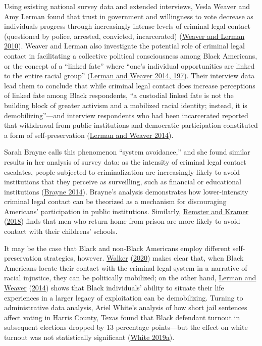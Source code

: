 \documentclass[
  12pt,
]{article}
\begin{document}
Using existing national survey data and extended interviews, Vesla Weaver and Amy Lerman found that trust in government and willingness to vote decrease as individuals progress through increasingly intense levels of criminal legal contact (questioned by police, arrested, convicted, incarcerated) (\protect\hyperlink{ref-Weaver2010}{Weaver and Lerman 2010}). Weaver and Lerman also investigate the potential role of criminal legal contact in facilitating a collective political consciousness among Black Americans, or the concept of a ``linked fate'' where ``one's individual opportunities are linked to the entire racial group'' (\protect\hyperlink{ref-Lerman2014}{Lerman and Weaver 2014, 197}). Their interview data lead them to conclude that while criminal legal contact does increase perceptions of linked fate among Black respondents, ``a custodial linked fate is not the building block of greater activism and a mobilized racial identity; instead, it is demobilizing''---and interview respondents who had been incarcerated reported that withdrawal from public institutions and democratic participation constituted a form of self-preservation (\protect\hyperlink{ref-Lerman2014}{Lerman and Weaver 2014}).

Sarah Brayne calls this phenomenon ``system avoidance,'' and she found similar results in her analysis of survey data: as the intensity of criminal legal contact escalates, people subjected to criminalization are increasingly likely to avoid institutions that they perceive as surveilling, such as financial or educational institutions (\protect\hyperlink{ref-Brayne2014}{Brayne 2014}). Brayne's analysis demonstrates how lower-intensity criminal legal contact can be theorized as a mechanism for discouraging Americans' participation in public institutions. Similarly, \protect\hyperlink{ref-Remster2018a}{Remster and Kramer} (\protect\hyperlink{ref-Remster2018a}{2018}) finds that men who return home from prison are more likely to avoid contact with their childrens' schools.

It may be the case that Black and non-Black Americans employ different self-preservation strategies, however. \protect\hyperlink{ref-Walker2020}{Walker} (\protect\hyperlink{ref-Walker2020}{2020}) makes clear that, when Black Americans locate their contact with the criminal legal system in a narrative of racial injustice, they can be politically mobilized; on the other hand, \protect\hyperlink{ref-Lerman2014}{Lerman and Weaver} (\protect\hyperlink{ref-Lerman2014}{2014}) shows that Black individuals' ability to situate their life experiences in a larger legacy of exploitation can be demobilizing. Turning to administrative data analysis, Ariel White's analysis of how short jail sentences affect voting in Harris County, Texas found that Black defendant turnout in subsequent elections dropped by 13 percentage points---but the effect on white turnout was not statistically significant (\protect\hyperlink{ref-White2019}{White 2019a}).
\end{document}
